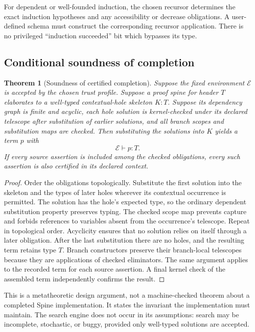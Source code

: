 \documentclass[11pt,letterpaper]{article}
\newtheorem{theorem}[proposition]{Theorem}
\theoremstyle{definition}
\theoremstyle{remark}
\newcommand{\Spine}{Spine}
\begin{document}
For dependent or well-founded induction, the chosen recursor determines the exact induction hypotheses and any accessibility or decrease obligations. A user-defined schema must construct the corresponding recursor application. There is no privileged ``induction succeeded'' bit which bypasses its type.

\subsection{Conditional soundness of completion}
\begin{theorem}[Soundness of certified completion]
\label{thm:soundness}
Suppose the fixed environment $\mathcal E$ is accepted by the chosen trust profile. Suppose a proof spine for header $T$ elaborates to a well-typed contextual-hole skeleton $K:T$. Suppose its dependency graph is finite and acyclic, each hole solution is kernel-checked under its declared telescope after substitution of earlier solutions, and all branch scopes and substitution maps are checked. Then substituting the solutions into $K$ yields a term $p$ with
\[
 \mathcal E\vdash p:T.
\]
If every source assertion is included among the checked obligations, every such assertion is also certified in its declared context.
\end{theorem}
\begin{proof}
Order the obligations topologically. Substitute the first solution into the skeleton and the types of later holes wherever its contextual occurrence is permitted. The solution has the hole's expected type, so the ordinary dependent substitution property preserves typing. The checked scope map prevents capture and forbids references to variables absent from the occurrence's telescope. Repeat in topological order. Acyclicity ensures that no solution relies on itself through a later obligation. After the last substitution there are no holes, and the resulting term retains type $T$. Branch constructors preserve their branch-local telescopes because they are applications of checked eliminators. The same argument applies to the recorded term for each source assertion. A final kernel check of the assembled term independently confirms the result.
\end{proof}
This is a metatheoretic design argument, not a machine-checked theorem about a completed \Spine{} implementation. It states the invariant the implementation must maintain. The search engine does not occur in its assumptions: search may be incomplete, stochastic, or buggy, provided only well-typed solutions are accepted.
\end{document}
